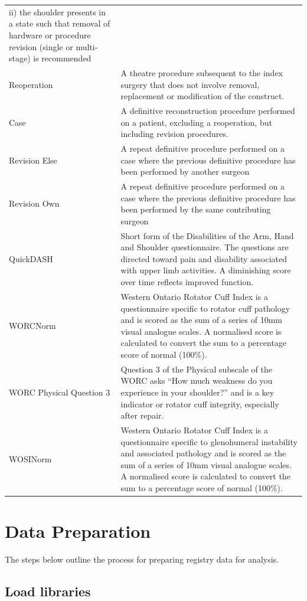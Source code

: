 \documentclass[
]{article}
\begin{document}
\begin{longtable}[]{@{}
  >{\raggedright\arraybackslash}p{}
  >{\raggedright\arraybackslash}p{}@{}}
ii) the shoulder presents in a state such that removal of hardware or
procedure revision (single or multi-stage) is recommended \\
Reoperation & A theatre procedure subsequent to the index surgery that
does not involve removal, replacement or modification of the
construct. \\
Case & A definitive reconstruction procedure performed on a patient,
excluding a reoperation, but including revision procedures. \\
Revision Else & A repeat definitive procedure performed on a case where
the previous definitive procedure has been performed by another
surgeon \\
Revision Own & A repeat definitive procedure performed on a case where
the previous definitive procedure has been performed by the same
contributing surgeon \\
QuickDASH & Short form of the Disabilities of the Arm, Hand and Shoulder
questionnaire. The questions are directed toward pain and disability
associated with upper limb activities. A diminishing score over time
reflects improved function. \\
WORCNorm & Western Ontario Rotator Cuff Index is a questionnaire
specific to rotator cuff pathology and is scored as the sum of a series
of 10mm visual analogue scales. A normalised score is calculated to
convert the sum to a percentage score of normal (100\%). \\
WORC Physical Question 3 & Question 3 of the Physical subscale of the
WORC asks ``How much weakness do you experience in your shoulder?'' and
is a key indicator or rotator cuff integrity, especially after
repair. \\
WOSINorm & Western Ontario Rotator Cuff Index is a questionnaire
specific to glenohumeral instability and associated pathology and is
scored as the sum of a series of 10mm visual analogue scales. A
normalised score is calculated to convert the sum to a percentage score
of normal (100\%). \\
\end{longtable}

\section{Data Preparation}\label{data-preparation}

The steps below outline the process for preparing registry data for
analysis.

\subsection{Load libraries}\label{load-libraries}
\end{document}
